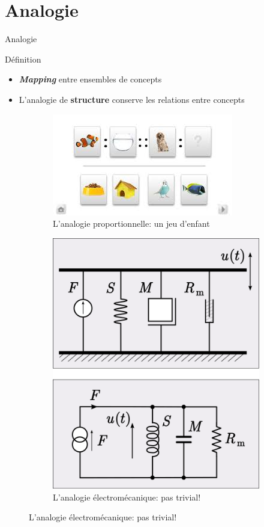 \documentclass[xcolor=table, hyperref={pdfpagelabels=false}]{beamer}
\begin{document}
\section{Analogie}
\begin{frame}{Analogie}
\begin{block}{Définition}
	\begin{itemize}
		\item \textit{\textbf{Mapping}} entre ensembles de concepts\pause
		\item L'analogie de \textbf{structure} conserve les relations entre concepts
	\end{itemize}
\end{block}\pause
\begin{figure}[H]
	\begin{subfigure}{.49\textwidth}
		\centering
		\includegraphics[width=.95\textwidth]{./images/kid_analogy.jpeg}
		\caption{L'analogie proportionnelle: un jeu d'enfant}
	\end{subfigure}\pause
	\begin{subfigure}{.49\textwidth}
		\centering
		\includegraphics[width=.65\textwidth]{./images/deep_analogy.png}
		\caption{L'analogie électromécanique: pas trivial!}
	\end{subfigure}
\end{figure}
\end{frame}
\end{document}
